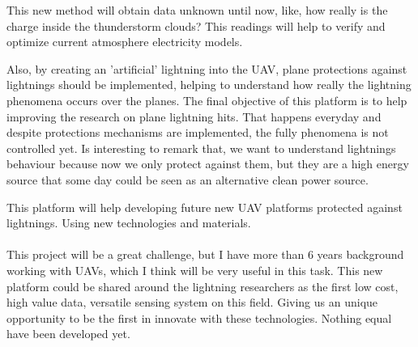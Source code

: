 \noindent This new method will obtain data unknown until now, like, how really is the charge inside the thunderstorm clouds? This readings will help to verify and optimize current atmosphere electricity models.

Also, by creating an 'artificial' lightning into the UAV, plane protections against lightnings should be implemented, helping to understand how really the lightning phenomena occurs over the planes. The final objective of this platform is to help improving the research on plane lightning hits. That happens everyday and despite protections mechanisms are implemented, the fully phenomena is not controlled yet. Is interesting to remark that, we want to understand lightnings behaviour because now we only protect against them, but they are a high energy source that some day could be seen as an alternative clean power source.

This platform will help developing future new UAV platforms protected against lightnings. Using new technologies and materials. 

\paragraph{} This project will be a great challenge, but I have more than 6 years background working with UAVs, which I think will be very useful in this task. This new platform could be shared around the lightning researchers as the first low cost, high value data, versatile sensing system on this field. Giving us an unique opportunity to be the first in innovate with these technologies. Nothing equal have been developed yet.
